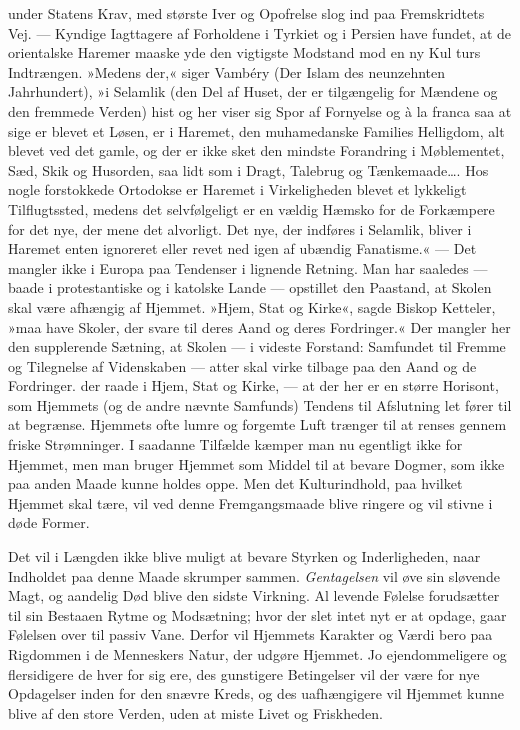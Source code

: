 \documentclass[12pt,a4paper]{article}
\newcommand{\opage}[1]{\marginnote{\footnotesize\textit{[#1]}}}
\begin{document}
under Statens Krav, med største Iver og Opofrelse slog ind paa Fremskridtets
Vej. --- Kyndige Iagttagere af Forholdene i Tyrkiet og i Persien have fundet,
at de orientalske Haremer maaske yde den vigtigste Modstand mod en ny Kul%
\opage{9}turs
Indtrængen. »Medens der,« siger Vambéry (Der Islam des neunzehnten
Jahrhundert), »i Selamlik (den Del af Huset, der er tilgængelig for Mændene
og den fremmede Verden) hist og her viser sig Spor af Fornyelse og à la
franca saa at sige er blevet et Løsen, er i Haremet, den muhamedanske
Families Helligdom, alt blevet ved det gamle, og der er ikke sket den mindste
Forandring i Møblementet, Sæd, Skik og Husorden, saa lidt som i Dragt,
Talebrug og Tænkemaade\ldots. Hos nogle forstokkede Ortodokse er Haremet i
Virkeligheden blevet et lykkeligt Tilflugtssted, medens det selvfølgeligt er en
vældig Hæmsko for de Forkæmpere for det nye, der mene det alvorligt. Det nye,
der indføres i Selamlik, bliver i Haremet enten ignoreret eller revet ned igen
af ubændig Fanatisme.« --- Det mangler ikke i Europa paa Tendenser i lignende
Retning. Man har saaledes --- baade i protestantiske og i katolske Lande ---
opstillet den Paastand, at Skolen skal være afhængig af Hjemmet. »Hjem, Stat
og Kirke«, sagde Biskop Ketteler, »maa have Skoler, der svare til deres Aand
og deres Fordringer.« Der mangler her den supplerende Sætning, at Skolen --- i
videste Forstand: Samfundet til Fremme og Tilegnelse af Videnskaben --- atter
skal virke tilbage paa den Aand og de Fordringer. der raade i Hjem, Stat og %
Kirke, --- at der her er en større Horisont, som Hjemmets (og de andre nævnte
Samfunds) Tendens til Afslutning let fører til at begrænse. Hjemmets ofte
lumre og forgemte Luft trænger til at renses gennem friske Strømninger. I
saadanne Tilfælde kæmper man nu egentligt ikke for Hjemmet, men man bruger
Hjemmet som Middel til at bevare Dogmer, som ikke paa anden Maade kunne holdes
oppe. Men det Kulturindhold, paa hvilket Hjemmet skal tære, vil ved denne
Fremgangsmaade blive ringere og vil stivne i døde Former.

Det vil i Længden ikke blive muligt at bevare Styrken og Inderligheden, naar
Indholdet paa denne Maade skrumper sammen. \emph{Gentagelsen} vil øve sin sløvende
Magt, og aandelig Død blive den sidste Virkning. Al levende Følelse
forudsætter til sin Bestaaen Rytme og Modsætning; hvor der slet intet nyt er
at opdage, gaar Følelsen over til passiv Vane. Derfor vil Hjemmets Karakter og
Værdi bero paa Rigdommen i de Menneskers Natur, der udgøre Hjemmet. Jo
ejendommeligere og flersidigere de hver for sig ere, des gunstigere
Betingelser vil der være for nye Opdagelser inden for den snævre Kreds, og des
uafhængigere vil Hjemmet kunne blive af den store Verden, uden at miste Livet
og Friskheden.
\end{document}
